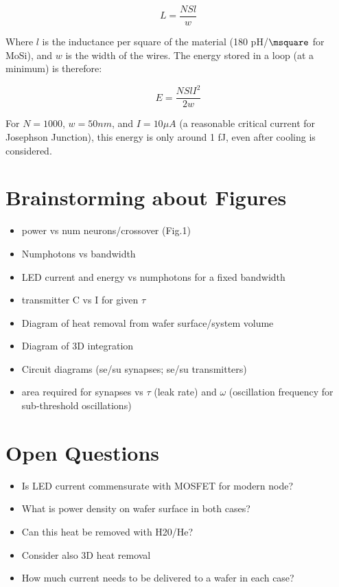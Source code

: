 \documentclass[twocolumn]{article}
\begin{document}
\begin{equation}
    L = \frac{NSl}{w}
\end{equation}

Where $l$ is the inductance per square of the material (180 pH/$\msquare$ for MoSi), and $w$ is the width of the wires. The energy stored in a loop (at a minimum) is therefore:

\begin{equation}
    E = \frac{NSlI^2}{2w}
\end{equation}

For $N=1000$, $w=50 nm$, and $I=10\mu A$ (a reasonable critical current for Josephson Junction), this energy is only around 1 fJ, even after cooling is considered.

\section{Brainstorming about Figures}
\begin{itemize}
    \item power vs num neurons/crossover (Fig.1)
    \item Numphotons vs bandwidth
    \item LED current and energy vs numphotons for a fixed bandwidth
    \item transmitter C vs I for given $\tau$
    \item Diagram of heat removal from wafer surface/system volume
    \item Diagram of 3D integration
    \item Circuit diagrams (se/su synapses; se/su transmitters)
    \item area required for synapses vs $\tau$ (leak rate) and $\omega$ (oscillation frequency for sub-threshold oscillations)
\end{itemize}

\section{Open Questions}
\begin{itemize}
    \item Is LED current commensurate with MOSFET for modern node?
    \item What is power density on wafer surface in both cases?
    \item Can this heat be removed with H20/He?
    \item Consider also 3D heat removal
    \item How much current needs to be delivered to a wafer in each case?
\end{itemize}
\end{document}
